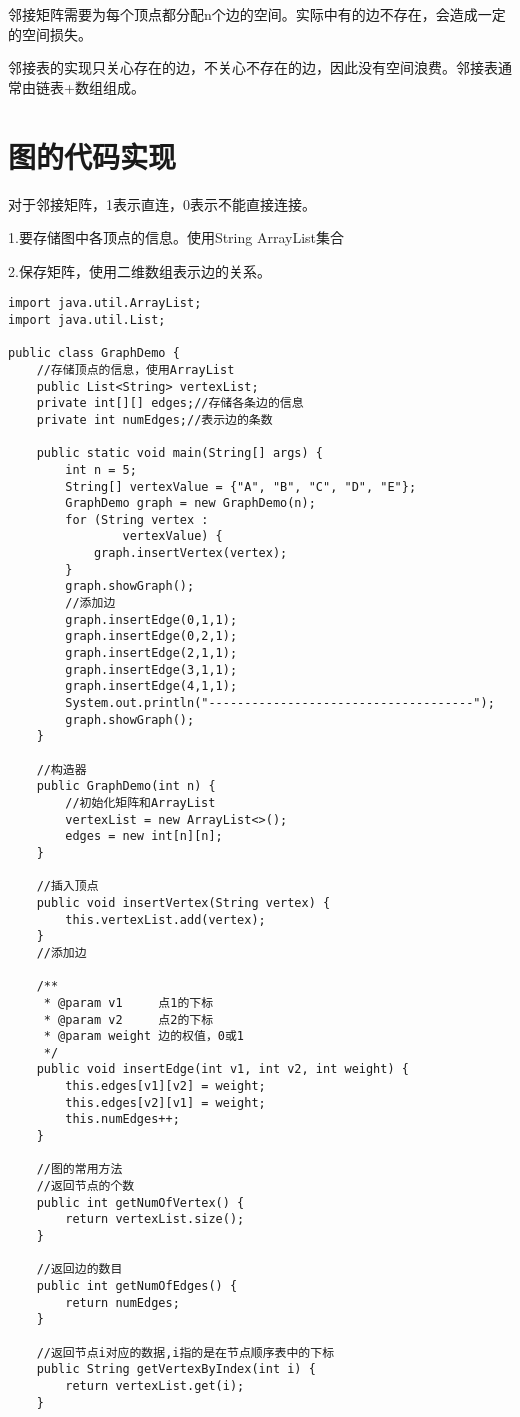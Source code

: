 \documentclass[a4paper]{report}
\begin{document}
邻接矩阵需要为每个顶点都分配n个边的空间。实际中有的边不存在，会造成一定的空间损失。

邻接表的实现只关心存在的边，不关心不存在的边，因此没有空间浪费。邻接表通常由链表+数组组成。
\section{图的代码实现}
对于邻接矩阵，1表示直连，0表示不能直接连接。

1.要存储图中各顶点的信息。使用String  ArrayList集合

2.保存矩阵，使用二维数组表示边的关系。
\begin{lstlisting}
import java.util.ArrayList;
import java.util.List;

public class GraphDemo {
    //存储顶点的信息，使用ArrayList
    public List<String> vertexList;
    private int[][] edges;//存储各条边的信息
    private int numEdges;//表示边的条数

    public static void main(String[] args) {
        int n = 5;
        String[] vertexValue = {"A", "B", "C", "D", "E"};
        GraphDemo graph = new GraphDemo(n);
        for (String vertex :
                vertexValue) {
            graph.insertVertex(vertex);
        }
        graph.showGraph();
        //添加边
        graph.insertEdge(0,1,1);
        graph.insertEdge(0,2,1);
        graph.insertEdge(2,1,1);
        graph.insertEdge(3,1,1);
        graph.insertEdge(4,1,1);
        System.out.println("-------------------------------------");
        graph.showGraph();
    }

    //构造器
    public GraphDemo(int n) {
        //初始化矩阵和ArrayList
        vertexList = new ArrayList<>();
        edges = new int[n][n];
    }

    //插入顶点
    public void insertVertex(String vertex) {
        this.vertexList.add(vertex);
    }
    //添加边

    /**
     * @param v1     点1的下标
     * @param v2     点2的下标
     * @param weight 边的权值，0或1
     */
    public void insertEdge(int v1, int v2, int weight) {
        this.edges[v1][v2] = weight;
        this.edges[v2][v1] = weight;
        this.numEdges++;
    }

    //图的常用方法
    //返回节点的个数
    public int getNumOfVertex() {
        return vertexList.size();
    }

    //返回边的数目
    public int getNumOfEdges() {
        return numEdges;
    }

    //返回节点i对应的数据,i指的是在节点顺序表中的下标
    public String getVertexByIndex(int i) {
        return vertexList.get(i);
    }


\end{lstlisting}
\end{document}
